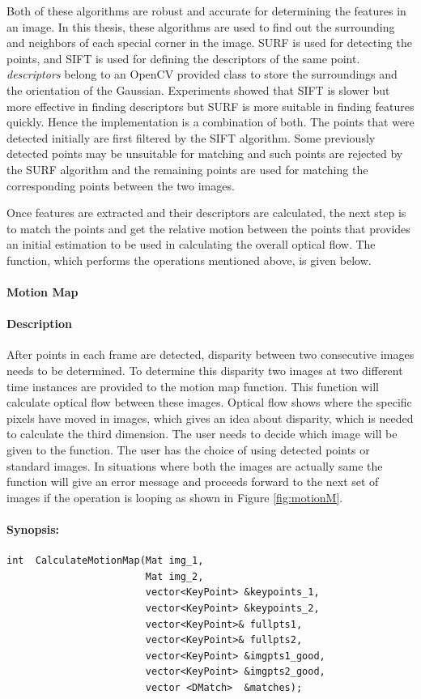 Both of  these algorithms are robust and accurate for determining the features in an image. In this thesis, these algorithms are used to 
find out the surrounding and neighbors of each special corner in the image. SURF is used for detecting the points, and SIFT is used for defining the descriptors of the same point. \textit{descriptors} belong to an OpenCV provided class to store the surroundings and the orientation of the Gaussian.
Experiments showed that SIFT is slower but more effective in finding descriptors but SURF is more suitable in finding features quickly. Hence the implementation is a combination of both. The points that were detected initially are first filtered by the SIFT algorithm. Some previously detected points may be unsuitable for matching and such points are rejected by the SURF algorithm and the remaining points are used for matching the corresponding points between the two images.

Once features are extracted and their descriptors are calculated, the next step is to match the points and get the relative motion between the points that provides an initial estimation to be used in calculating the overall optical flow. The function, which performs the operations mentioned above, is given below.

\paragraph{Motion Map}
\paragraph{Description}
After points in each frame are detected, disparity between two consecutive images needs to be determined. To determine this disparity two images at two different time instances are provided to the motion map function. This function will calculate optical flow between these images. Optical flow shows where the specific pixels have moved in images, which gives an idea about disparity, which is needed to calculate the third dimension. The user needs to decide which image will be given to the function. The user has the choice of using detected points or standard images. In situations where both the images are actually same the function will give an error message and proceeds forward to the next set of images if the operation is looping as shown in Figure \ref{fig:motionM}.
\paragraph{Synopsis:}
\begin{lstlisting}
int  CalculateMotionMap(Mat img_1, 
						Mat img_2, 
						vector<KeyPoint> &keypoints_1, 
						vector<KeyPoint> &keypoints_2,
						vector<KeyPoint>& fullpts1,
						vector<KeyPoint>& fullpts2,
						vector<KeyPoint> &imgpts1_good,
						vector<KeyPoint> &imgpts2_good,
						vector <DMatch>  &matches);
 \end{lstlisting}
